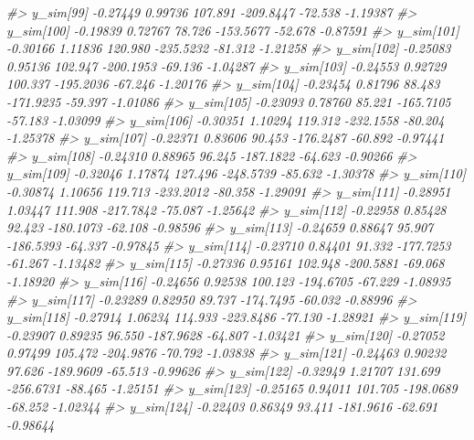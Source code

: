 \documentclass[
  10pt,
  italian,
  a4paper,
  extrafontsizes,onecolumn,openright
  ]{memoir}
\newenvironment{Shaded}{\begin{snugshade}}{\end{snugshade}}
\newcommand{\CommentTok}[1]{\textcolor[rgb]{0.56,0.35,0.01}{\textit{#1}}}
\begin{document}
\begin{Shaded}
\begin{Highlighting}[]
\CommentTok{\#\textgreater{} y\_sim[99]  {-}0.27449 0.99736 107.891 {-}209.8447 {-}72.538 {-}1.19387}
\CommentTok{\#\textgreater{} y\_sim[100] {-}0.19839 0.72767  78.726 {-}153.5677 {-}52.678 {-}0.87591}
\CommentTok{\#\textgreater{} y\_sim[101] {-}0.30166 1.11836 120.980 {-}235.5232 {-}81.312 {-}1.21258}
\CommentTok{\#\textgreater{} y\_sim[102] {-}0.25083 0.95136 102.947 {-}200.1953 {-}69.136 {-}1.04287}
\CommentTok{\#\textgreater{} y\_sim[103] {-}0.24553 0.92729 100.337 {-}195.2036 {-}67.246 {-}1.20176}
\CommentTok{\#\textgreater{} y\_sim[104] {-}0.23454 0.81796  88.483 {-}171.9235 {-}59.397 {-}1.01086}
\CommentTok{\#\textgreater{} y\_sim[105] {-}0.23093 0.78760  85.221 {-}165.7105 {-}57.183 {-}1.03099}
\CommentTok{\#\textgreater{} y\_sim[106] {-}0.30351 1.10294 119.312 {-}232.1558 {-}80.204 {-}1.25378}
\CommentTok{\#\textgreater{} y\_sim[107] {-}0.22371 0.83606  90.453 {-}176.2487 {-}60.892 {-}0.97441}
\CommentTok{\#\textgreater{} y\_sim[108] {-}0.24310 0.88965  96.245 {-}187.1822 {-}64.623 {-}0.90266}
\CommentTok{\#\textgreater{} y\_sim[109] {-}0.32046 1.17874 127.496 {-}248.5739 {-}85.632 {-}1.30378}
\CommentTok{\#\textgreater{} y\_sim[110] {-}0.30874 1.10656 119.713 {-}233.2012 {-}80.358 {-}1.29091}
\CommentTok{\#\textgreater{} y\_sim[111] {-}0.28951 1.03447 111.908 {-}217.7842 {-}75.087 {-}1.25642}
\CommentTok{\#\textgreater{} y\_sim[112] {-}0.22958 0.85428  92.423 {-}180.1073 {-}62.108 {-}0.98596}
\CommentTok{\#\textgreater{} y\_sim[113] {-}0.24659 0.88647  95.907 {-}186.5393 {-}64.337 {-}0.97845}
\CommentTok{\#\textgreater{} y\_sim[114] {-}0.23710 0.84401  91.332 {-}177.7253 {-}61.267 {-}1.13482}
\CommentTok{\#\textgreater{} y\_sim[115] {-}0.27336 0.95161 102.948 {-}200.5881 {-}69.068 {-}1.18920}
\CommentTok{\#\textgreater{} y\_sim[116] {-}0.24656 0.92538 100.123 {-}194.6705 {-}67.229 {-}1.08935}
\CommentTok{\#\textgreater{} y\_sim[117] {-}0.23289 0.82950  89.737 {-}174.7495 {-}60.032 {-}0.88996}
\CommentTok{\#\textgreater{} y\_sim[118] {-}0.27914 1.06234 114.933 {-}223.8486 {-}77.130 {-}1.28921}
\CommentTok{\#\textgreater{} y\_sim[119] {-}0.23907 0.89235  96.550 {-}187.9628 {-}64.807 {-}1.03421}
\CommentTok{\#\textgreater{} y\_sim[120] {-}0.27052 0.97499 105.472 {-}204.9876 {-}70.792 {-}1.03838}
\CommentTok{\#\textgreater{} y\_sim[121] {-}0.24463 0.90232  97.626 {-}189.9609 {-}65.513 {-}0.99626}
\CommentTok{\#\textgreater{} y\_sim[122] {-}0.32949 1.21707 131.699 {-}256.6731 {-}88.465 {-}1.25151}
\CommentTok{\#\textgreater{} y\_sim[123] {-}0.25165 0.94011 101.705 {-}198.0689 {-}68.252 {-}1.02344}
\CommentTok{\#\textgreater{} y\_sim[124] {-}0.22403 0.86349  93.411 {-}181.9616 {-}62.691 {-}0.98644}

\end{Highlighting}
\end{Shaded}
\end{document}

